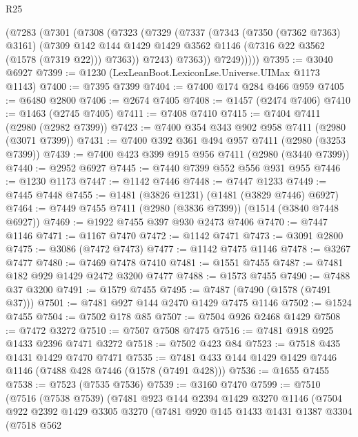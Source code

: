 \begin{lexlean}{R25}
\begin{coremodule}
        (@7283
          (@7301
            (@7308
              (@7323
                (@7329
                  (@7337
                    (@7343
                      (@7350 (@7362 @7363) @3161)
                      (@7309
                        @142
                        @144
                        @1429
                        @1429
                        @3562
                        @1146
                        (@7316 @22 @3562 (@1578 (@7319 @22)))
                        @7363))
                    @7243)
                  @7363))
              @7249)))))
@7395 := @3040 @6927
@7399 := @1230 (LexLeanBoot.LexiconLse.Universe.UIMax @1173 @1143)
@7400 := @7395 @7399
@7404 := @7400 @174 @284 @466 @959
@7405 := @6480 @2800
@7406 := @2674 @7405
@7408 := @1457 (@2474 @7406)
@7410 := @1463 (@2745 @7405)
@7411 := @7408 @7410
@7415 := @7404 @7411 (@2980 (@2982 @7399))
@7423 := @7400 @354 @343 @902 @958 @7411 (@2980 (@3071 @7399))
@7431 := @7400 @392 @361 @494 @957 @7411 (@2980 (@3253 @7399))
@7439 := @7400 @423 @399 @915 @956 @7411 (@2980 (@3440 @7399))
@7440 := @2952 @6927
@7445 := @7440 @7399 @552 @556 @931 @955
@7446 := @1230 @1173
@7447 := @1142 @7446
@7448 := @7447 @1233
@7449 := @7445 @7448
@7455 := @1481 (@3826 @1231) (@1481 (@3829 @7446) @6927)
@7464 := @7449 @7455 @7411 (@2980 (@3836 @7399)) (@1514 (@3840 @7448 @6927))
@7469 := @1922 @7455 @397 @930 @2473 @7406
@7470 := @7447 @1146
@7471 := @1167 @7470
@7472 := @1142 @7471
@7473 := @3091 @2800
@7475 := @3086 (@7472 @7473)
@7477 := @1142 @7475 @1146
@7478 := @3267 @7477
@7480 := @7469 @7478 @7410
@7481 := @1551 @7455
@7487 := @7481 @182 @929 @1429 @2472 @3200 @7477
@7488 := @1573 @7455
@7490 := @7488 @37 @3200
@7491 := @1579 @7455
@7495 := @7487 (@7490 (@1578 (@7491 @37)))
@7501 := @7481 @927 @144 @2470 @1429 @7475 @1146
@7502 := @1524 @7455
@7504 := @7502 @178 @85
@7507 := @7504 @926 @2468 @1429
@7508 := @7472 @3272
@7510 := @7507 @7508 @7475
@7516 := @7481 @918 @925 @1433 @2396 @7471 @3272
@7518 := @7502 @423 @84
@7523 := @7518 @435 @1431 @1429 @7470 @7471
@7535 := @7481 @433 @144 @1429 @1429 @7446 @1146 (@7488 @428 @7446 (@1578 (@7491 @428)))
@7536 := @1655 @7455
@7538 := @7523 (@7535 @7536)
@7539 := @3160 @7470
@7599 := @7510
    (@7516
      (@7538 @7539)
      (@7481
        @923
        @144
        @2394
        @1429
        @3270
        @1146
        (@7504
          @922
          @2392
          @1429
          @3305
          @3270
          (@7481
            @920
            @145
            @1433
            @1431
            @1387
            @3304
            (@7518
              @562

\end{coremodule}
\end{lexlean}
